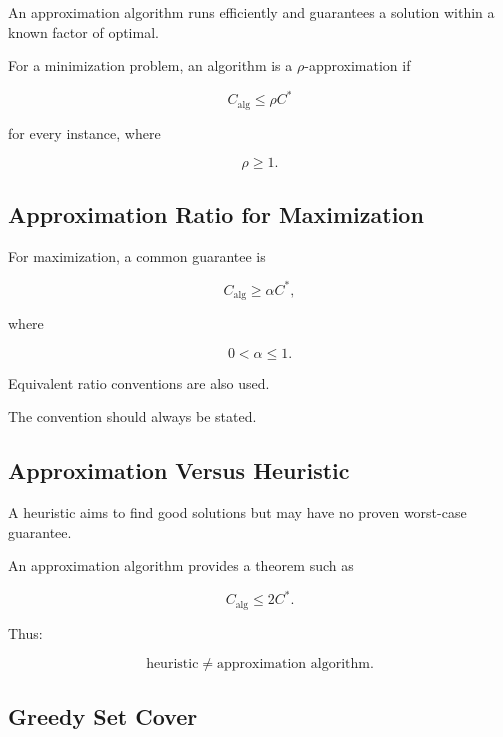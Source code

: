 An approximation algorithm runs efficiently and guarantees a solution
within a known factor of optimal.

For a minimization problem, an algorithm is a \(\rho\)-approximation if

\[
\boxed{
C_{\mathrm{alg}}
\leq
\rho
C^*
}
\]

for every instance, where

\[
\rho\geq1.
\]

\subsection{Approximation Ratio for Maximization}
\label{subsec:maximization-approximation-ratio}

For maximization, a common guarantee is

\[
\boxed{
C_{\mathrm{alg}}
\geq
\alpha
C^*,
}
\]

where

\[
0<\alpha\leq1.
\]

Equivalent ratio conventions are also used.

The convention should always be stated.

\subsection{Approximation Versus Heuristic}
\label{subsec:approximation-versus-heuristic}

A heuristic aims to find good solutions but may have no proven
worst-case guarantee.

An approximation algorithm provides a theorem such as

\[
\boxed{
C_{\mathrm{alg}}
\leq
2C^*.
}
\]

Thus:

\[
\boxed{
\text{heuristic}
\neq
\text{approximation algorithm}.
}
\]

\subsection{Greedy Set Cover}
\label{subsec:greedy-set-cover}

